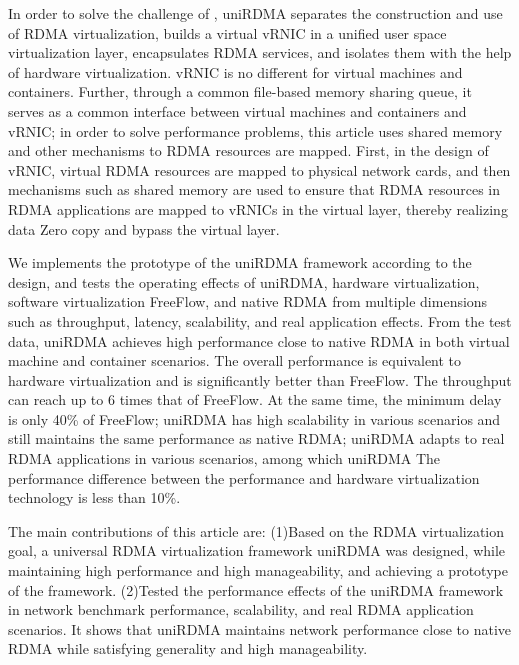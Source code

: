 \documentclass[sigplan,screen]{acmart}
\begin{document}
In order to solve the challenge of , uniRDMA separates the construction and use of RDMA virtualization, builds a virtual vRNIC in a unified user space virtualization layer, encapsulates RDMA services, and isolates them with the help of hardware virtualization. vRNIC is no different for virtual machines and containers. Further, through a common file-based memory sharing queue, it serves as a common interface between virtual machines and containers and vRNIC; in order to solve performance problems, this article uses shared memory and other mechanisms to RDMA resources are mapped. First, in the design of vRNIC, virtual RDMA resources are mapped to physical network cards, and then mechanisms such as shared memory are used to ensure that RDMA resources in RDMA applications are mapped to vRNICs in the virtual layer, thereby realizing data Zero copy and bypass the virtual layer.

We implements the prototype of the uniRDMA framework according to the design, and tests the operating effects of uniRDMA, hardware virtualization, software virtualization FreeFlow, and native RDMA from multiple dimensions such as throughput, latency, scalability, and real application effects. From the test data, uniRDMA achieves high performance close to native RDMA in both virtual machine and container scenarios. The overall performance is equivalent to hardware virtualization and is significantly better than FreeFlow. The throughput can reach up to 6 times that of FreeFlow. At the same time, the minimum delay is only 40\% of FreeFlow; uniRDMA has high scalability in various scenarios and still maintains the same performance as native RDMA; uniRDMA adapts to real RDMA applications in various scenarios, among which uniRDMA The performance difference between the performance and hardware virtualization technology is less than 10\%.

The main contributions of this article are:
(1)Based on the RDMA virtualization goal, a universal RDMA virtualization framework uniRDMA was designed, while maintaining high performance and high manageability, and achieving a prototype of the framework.
(2)Tested the performance effects of the uniRDMA framework in network benchmark performance, scalability, and real RDMA application scenarios. It shows that uniRDMA maintains network performance close to native RDMA while satisfying generality and high manageability.
\end{document}
